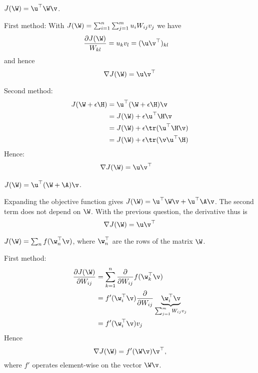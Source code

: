 \begin{exenumerate}
\item $J(\W) = \u^\top\W\v$.
  
\begin{solution}
  First method: With $J(\W) = \sum_{i=1}^n \sum_{j=1}^m u_iW_{ij}v_j$ we have
  \begin{align}
    \frac{\partial J(\W)}{W_{kl}} &= u_kv_l = (\u\v^\top)_{kl}
  \end{align}
  and hence
\begin{equation}
  \nabla J(\W) = \u\v^\top
\end{equation}

Second method: 
\begin{align}
  J(\W + \epsilon \H) & = \u^\top (\W+\epsilon \H)\v\\
                      & = J(\W) + \epsilon \u^\top \H \v\\
                      & = J(\W) + \epsilon \tr(\u^\top \H \v)\\
                      & = J(\W) + \epsilon \tr(\v \u^\top \H)
\end{align}
Hence:
\begin{align}
  \nabla J(\W) & = \u\v^\top
\end{align}

\end{solution}

\item $J(\W) = \u^\top(\W+\A)\v$.
\begin{solution}
  Expanding the objective function gives $J(\W) = \u^\top \W \v
  + \u^\top \A \v$. The second term does not depend on $\W$. With the previous
  question, the derivative thus is
  \begin{equation}
    \nabla J(\W) = \u \v^\top
  \end{equation}
  
\end{solution}
\item $J(\W) = \sum_n f(\w_n^\top\v)$, where $\w_n^\top$ are the rows of the matrix $\W$.
  
  \begin{solution}
    First method:
    \begin{align}
      \frac{\partial J(\W)}{\partial W_{ij}} &= \sum_{k=1}^n \frac{\partial}{\partial W_{ij}} f(\w_k^\top\v) \\
                                             &= f'(\w_i^\top\v) \frac{\partial}{\partial W_{ij}} \underbrace{\w_i^\top\v}_\text{$\sum_{j=1}^m W_{ij}v_j$} \\
                                             &= f'(\w_i^\top\v)v_j
    \end{align}
    Hence
    \begin{equation}
      \nabla J(\W) = f'(\W\v)\v^\top,
    \end{equation}
    where $f'$ operates element-wise on the vector $\W\v$.
    

\end{solution}
\end{exenumerate}

